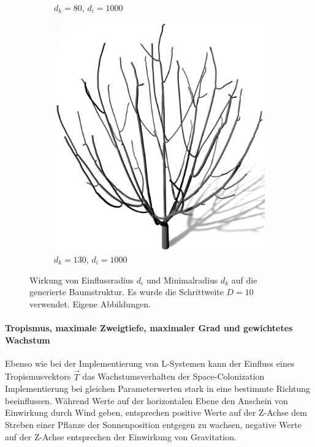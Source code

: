 \begin{figure} [hbtp]
\begin{subfigure}[t]{.45\textwidth}
		\caption{$d_k = 80$, $d_i = 1000$}
		\label{subfig:SCA_KDRI_LowKD_HighRI}
	\end{subfigure}
	\hspace{.05\linewidth}
	\begin{subfigure}[t]{.45\textwidth}
		\centering
		\includegraphics[height=.21\textheight]{images/SCA_KDRI_HighKD_HighRI.png}
		\caption{$d_k = 130$, $d_i = 1000$}
		\label{subfig:SCA_KDRI_HighKD_HighRI}
	\end{subfigure}
	\caption{Wirkung von Einflussradius $d_i$ und Minimalradius $d_k$ auf die generierte Baumstruktur. Es wurde die Schrittweite $D = 10$ verwendet. Eigene Abbildungen.}
	\label{fig:SCA_KDRI}
\end{figure}

\paragraph{Tropismus, maximale Zweigtiefe, maximaler Grad und gewichtetes Wachstum}

Ebenso wie bei der Implementierung von L-Systemen kann der Einfluss eines Tropismusvektors $\overrightarrow{T}$ das Wachstumsverhalten der Space-Colonization Implementierung bei gleichen Parameterwerten stark in eine bestimmte Richtung beeinflussen. Während Werte auf der horizontalen Ebene den Anschein von Einwirkung durch Wind geben, entsprechen positive Werte auf der Z-Achse dem Streben einer Pflanze der Sonnenposition entgegen zu wachsen, negative Werte auf der Z-Achse entsprechen der Einwirkung von Gravitation.

